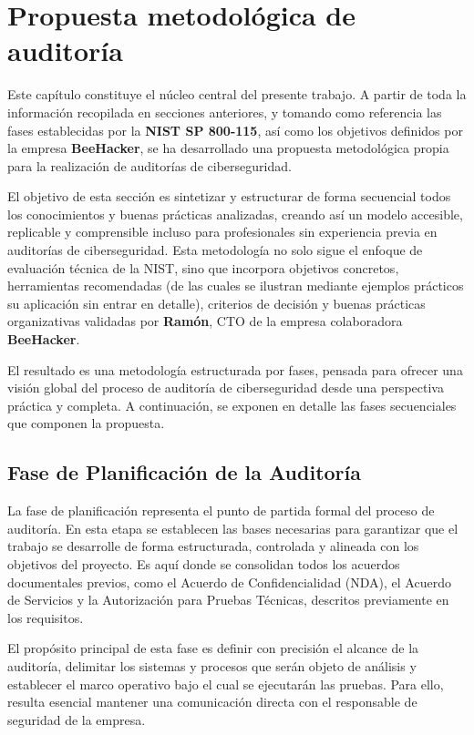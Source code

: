 \documentclass[a4paper, 11pt]{article}
\begin{document}
\section{Propuesta metodológica de auditoría}


Este capítulo constituye el núcleo central del presente trabajo. A partir de toda la información recopilada en secciones anteriores, y tomando como referencia las fases establecidas por la \textbf{NIST SP 800-115}, así como los objetivos definidos por la empresa \textbf{BeeHacker}, se ha desarrollado una propuesta metodológica propia para la realización de auditorías de ciberseguridad.


El objetivo de esta sección es sintetizar y estructurar de forma secuencial todos los conocimientos y buenas prácticas analizadas, creando así un modelo accesible, replicable y comprensible incluso para profesionales sin experiencia previa en auditorías de ciberseguridad. Esta metodología no solo sigue el enfoque de evaluación técnica de la NIST, sino que incorpora objetivos concretos, herramientas recomendadas (de las cuales se ilustran mediante ejemplos prácticos su aplicación sin entrar en detalle), criterios de decisión y buenas prácticas organizativas validadas por \textbf{Ramón}, CTO de la empresa colaboradora \textbf{BeeHacker}.


El resultado es una metodología estructurada por fases, pensada para ofrecer una visión global del proceso de auditoría de ciberseguridad desde una perspectiva práctica y completa. A continuación, se exponen en detalle las fases secuenciales que componen la propuesta.




\subsection{Fase de Planificación de la Auditoría}


La fase de planificación representa el punto de partida formal del proceso de auditoría. En esta etapa se establecen las bases necesarias para garantizar que el trabajo se desarrolle de forma estructurada, controlada y alineada con los objetivos del proyecto. Es aquí donde se consolidan todos los acuerdos documentales previos, como el Acuerdo de Confidencialidad (NDA), el Acuerdo de Servicios y la Autorización para Pruebas Técnicas, descritos previamente en los requisitos.


El propósito principal de esta fase es definir con precisión el alcance de la auditoría, delimitar los sistemas y procesos que serán objeto de análisis y establecer el marco operativo bajo el cual se ejecutarán las pruebas. Para ello, resulta esencial mantener una comunicación directa con el responsable de seguridad de la empresa.
\end{document}
